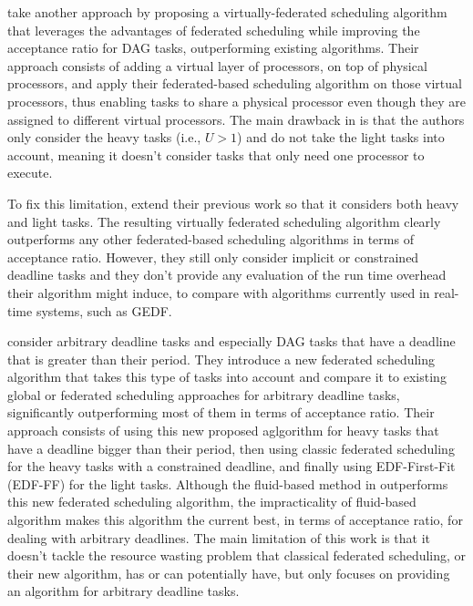 \citet{JiangVirtuallyFederatedSched2021}
take another approach by proposing a virtually-federated 
scheduling algorithm that leverages the advantages
of federated scheduling while improving the acceptance 
ratio for DAG tasks, outperforming existing algorithms.
Their approach consists of adding a virtual layer
of processors, on top of physical processors,
and apply their federated-based scheduling algorithm on those virtual processors,
thus enabling tasks to share a physical processor
even though they are assigned to different virtual processors.
The main drawback in \cite{JiangVirtuallyFederatedSched2021}
is that the authors only consider the heavy tasks (i.e., $U > 1$)
and do not take the light tasks into account,
meaning it doesn't consider tasks that only need 
one processor to execute.

To fix this limitation, \citet{Jiang2023SchedVirtualProcs}
extend their previous work\cite{JiangVirtuallyFederatedSched2021}
so that it considers both heavy and light tasks.
The resulting virtually federated scheduling algorithm
clearly outperforms any other federated-based scheduling algorithms
in terms of acceptance ratio.
However, they still only consider implicit or constrained deadline tasks
and they don't provide any evaluation of the run time overhead 
their algorithm might induce, to compare with algorithms currently used
in real-time systems, such as GEDF.


\citet{Guan2023FederatedNew} 
consider arbitrary deadline tasks and especially
DAG tasks that have a deadline that is greater than their period.
They introduce a new federated scheduling algorithm 
that takes this type of tasks into account 
and compare it to existing global or federated scheduling approaches
for arbitrary deadline tasks, significantly outperforming
most of them in terms of acceptance ratio.
Their approach consists of using this new proposed aglgorithm 
for heavy tasks that have a deadline bigger than their period,
then using classic federated scheduling for the heavy tasks with a 
constrained deadline, and finally using EDF-First-Fit (EDF-FF) for the light tasks.
Although the fluid-based method in \cite{GuanFluidDag2022}
outperforms this new federated scheduling algorithm,
the impracticality of fluid-based algorithm makes this algorithm
the current best, in terms of acceptance ratio, for dealing with arbitrary
deadlines. The main limitation of this work 
is that it doesn't tackle the resource wasting problem 
that classical federated scheduling, or their new algorithm, has or can potentially have, but only
focuses on providing an algorithm for arbitrary deadline tasks.

